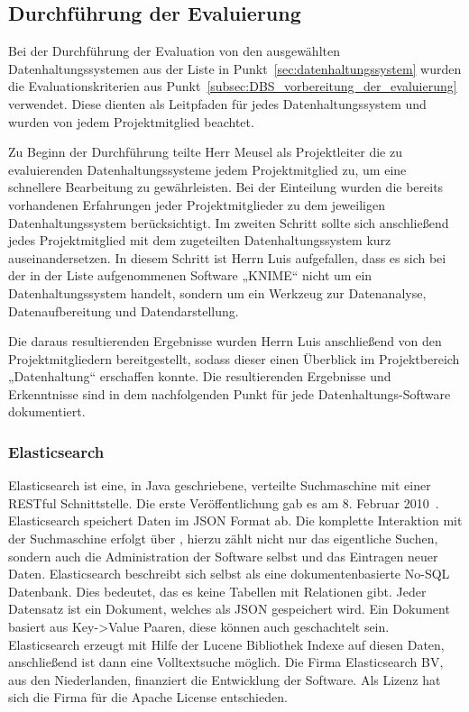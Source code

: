 \subsection{Durchführung der Evaluierung}
\label{subsec:durchfuehrung_der_evaluierung}
Bei der Durchführung der Evaluation von den ausgewählten Datenhaltungssystemen
aus der Liste in Punkt~\ref{sec:datenhaltungssystem} wurden die
Evaluationskriterien aus Punkt~\ref{subsec:DBS_vorbereitung_der_evaluierung}
verwendet. Diese dienten als Leitpfaden für jedes Datenhaltungssystem und
wurden von jedem Projektmitglied beachtet.

Zu Beginn der Durchführung teilte Herr Meusel als Projektleiter die zu
evaluierenden Datenhaltungssysteme jedem Projektmitglied zu, um eine schnellere
Bearbeitung zu gewährleisten. Bei der Einteilung wurden die bereits vorhandenen
Erfahrungen jeder Projektmitglieder zu dem jeweiligen Datenhaltungssystem
berücksichtigt. Im zweiten Schritt sollte sich anschließend jedes
Projektmitglied mit dem zugeteilten Datenhaltungssystem kurz auseinandersetzen.
In diesem Schritt ist Herrn Luis aufgefallen, dass es sich bei der in der Liste
aufgenommenen Software „KNIME“ nicht um ein Datenhaltungssystem handelt,
sondern um ein Werkzeug zur Datenanalyse, Datenaufbereitung und
Datendarstellung.

Die daraus resultierenden Ergebnisse wurden Herrn Luis anschließend von den
Projektmitgliedern bereitgestellt, sodass dieser einen Überblick im
Projektbereich „Datenhaltung“ erschaffen konnte. Die resultierenden
Ergebnisse und Erkenntnisse sind in dem nachfolgenden Punkt für jede
Datenhaltungs-Software dokumentiert.
\nl%

\subsubsection{Elasticsearch}
\label{subsubsec:elasticsearch}
Elasticsearch ist eine, in Java geschriebene, verteilte Suchmaschine mit einer
\gls{RESTful} Schnittstelle. Die erste Veröffentlichung gab es am 8. Februar
2010~\cite{es_release}. Elasticsearch speichert Daten im \gls{JSON} Format ab.
Die komplette Interaktion mit der Suchmaschine erfolgt über
, hierzu zählt nicht nur das eigentliche Suchen, sondern
auch die Administration der Software selbst und das Eintragen neuer Daten.
Elasticsearch beschreibt sich selbst als eine dokumentenbasierte No-SQL
Datenbank. Dies bedeutet, das es keine Tabellen mit Relationen gibt. Jeder
Datensatz ist ein Dokument, welches als \gls{JSON} gespeichert wird. Ein
Dokument basiert aus Key->Value Paaren, diese können auch geschachtelt sein.
Elasticsearch erzeugt mit Hilfe der \gls{Lucene} Bibliothek Indexe auf diesen
Daten, anschließend ist dann eine Volltextsuche möglich. Die Firma
Elasticsearch BV, aus den Niederlanden, finanziert die Entwicklung der
Software. Als Lizenz hat sich die Firma für die Apache License entschieden.


